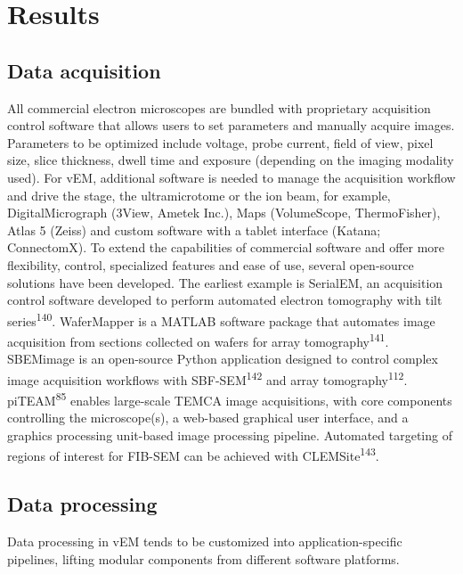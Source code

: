 \documentclass{article}
\begin{document}
\section*{Results}

\subsection*{Data acquisition}

All commercial electron microscopes are bundled with proprietary acquisition control software that allows users to set parameters and manually acquire images. Parameters to be optimized include voltage, probe current, field of view, pixel size, slice thickness, dwell time and exposure (depending on the imaging modality used). For vEM, additional software is needed to manage the acquisition workflow and drive the stage, the ultramicrotome or the ion beam, for example, DigitalMicrograph (3View, Ametek Inc.), Maps (VolumeScope, ThermoFisher), Atlas 5 (Zeiss) and custom software with a tablet interface (Katana; ConnectomX). To extend the capabilities of commercial software and offer more flexibility, control, specialized features and ease of use, several open-source solutions have been developed. The earliest example is SerialEM, an acquisition control software developed to perform automated electron tomography with tilt series\textsuperscript{140}. WaferMapper is a MATLAB software package that automates image acquisition from sections collected on wafers for array tomography\textsuperscript{141}. SBEMimage is an open-source Python application designed to control complex image acquisition workflows with SBF-SEM\textsuperscript{142} and array tomography\textsuperscript{112}. piTEAM\textsuperscript{85} enables large-scale TEMCA image acquisitions, with core components controlling the microscope(s), a web-based graphical user interface, and a graphics processing unit-based image processing pipeline. Automated targeting of regions of interest for FIB-SEM can be achieved with CLEMSite\textsuperscript{143}.

\subsection*{Data processing}

Data processing in vEM tends to be customized into application-specific pipelines, lifting modular components from different software platforms.
\end{document}
